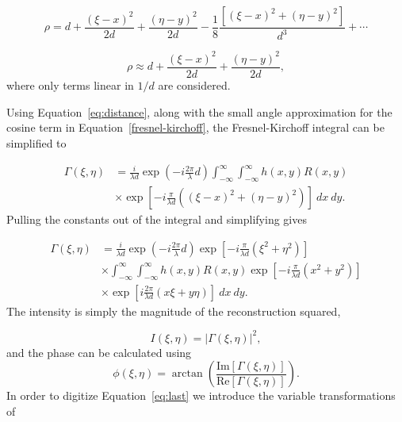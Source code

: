     \begin{equation}
        \rho=d+\frac{(\xi-x)^{2}}{2d}+\frac{(\eta-y)^{2}}{2d}-\frac{1}{8}\frac{\left[
        (\xi-x)^{2}+(\eta-y)^{2} \right]}{d^{3}} + \cdots
    \end{equation}

    \begin{equation}
        \rho\approx d+\frac{(\xi-x)^{2}}{2d}+\frac{(\eta-y)^{2}}{2d} ,
        \label{eq:distance}
    \end{equation}
    where only terms linear in $1/d$ are considered.

    Using Equation~\ref{eq:distance}, along with the small angle approximation
    for the cosine term in Equation~\ref{fresnel-kirchoff}, the Fresnel-Kirchoff
    integral can be simplified to
        

    \begin{equation}
        \begin{aligned}
        \Gamma(\xi,\eta) &= \frac{i}{\lambda d} \exp\left( -i\frac{2\pi}{\lambda}d \right)
        \int_{-\infty}^{\infty}\int_{-\infty}^{\infty}h(x,y)R(x,y) \\
        & \times \exp\left[ -i\frac{\pi}{\lambda d}\left(
        (\xi-x)^{2}+(\eta-y)^{2} \right) \right]~dx~dy .
        \end{aligned}
    \end{equation}
Pulling the constants out of the integral and simplifying gives

    \begin{equation}
        \begin{aligned}
        \Gamma(\xi,\eta) &= \frac{i}{\lambda d} \exp\left( -i\frac{2\pi}{\lambda}d \right)
        \exp\left[ -i\frac{\pi}{\lambda d}(\xi^2+\eta^2) \right] \\
        &\times \int_{-\infty}^{\infty}\int_{-\infty}^{\infty}h(x,y)R(x,y)
        \exp\left[ -i\frac{\pi}{\lambda d}\left(
        x^{2}+y^{2} \right) \right] \\
        & \times \exp\left[ i\frac{2\pi}{\lambda d}\left(
        x\xi+y\eta \right) \right]~dx~dy .
        \end{aligned}
        \label{eq:last}
    \end{equation}
%
    The intensity is simply the magnitude of the reconstruction squared,

    \begin{equation}
        I(\xi,\eta) = |\Gamma(\xi,\eta)|^{2} ,
    \end{equation}
%
    and the phase can be calculated using
    \begin{equation}
        \phi(\xi,\eta)=\arctan\left(
        \frac{\mathrm{Im}[\Gamma(\xi,\eta)]}{\mathrm{Re}[\Gamma(\xi,\eta)]}
        \right).
    \end{equation}
%
    In order to digitize Equation~\ref{eq:last} we introduce the variable
    transformations of

